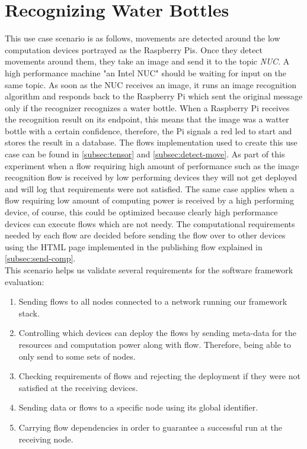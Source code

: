 \section{Recognizing Water Bottles } \label{sec:rwb}


This use case scenario is as follows, movements are detected around the low computation devices portrayed as the Raspberry Pis. Once they detect movements around them, they take an image and send it to the topic \textit{NUC}. A high performance machine "an Intel NUC" should be waiting for input on the same topic. As soon as the NUC  receives an image, it runs an image recognition algorithm and responds back to the Raspberry Pi which sent the original message  only if the recognizer recognizes a water bottle. When a Raspberry Pi receives the recognition result on its endpoint, this means that the image was a watter bottle with a certain confidence, therefore, the Pi signals a red led to start and stores the result in a database. The flows implementation used to create this use case can be found in \ref{subsec:tensor} and \ref{subsec:detect-move}.  As part of this experiment when a flow requiring high amount of performance such as the image recognition flow is received by low performing devices they will not get deployed and  will log that requirements were not satisfied. The same case applies when a flow requiring low amount of computing power is received by a high performing device, of course, this could be optimized because clearly high performance devices can execute flows which are not needy. The computational requirements needed by each flow are decided before sending the flow over to other devices using the HTML page implemented in the publishing flow explained in \ref{subsec:send-comp}.\\ 

This scenario helps us validate several requirements for the software framework evaluation: 
\begin{enumerate}
	\item Sending flows to all nodes connected to a network  running our framework stack.
	\item Controlling which devices can deploy the flows by sending meta-data for the resources and computation power along with flow. Therefore, being able to only send to some sets of nodes.
	\item Checking requirements of flows and rejecting the deployment if they were not satisfied at the receiving devices.
	\item Sending data or flows to a  specific node using its global identifier.
	\item Carrying flow dependencies in order to guarantee a successful run at the receiving node.
\end{enumerate}

